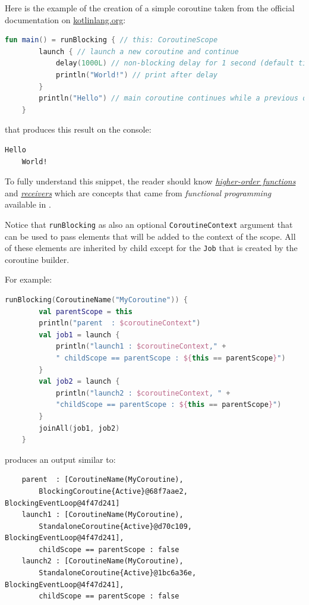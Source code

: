 Here is the example of the creation of a simple coroutine taken from the official documentation on \href{https://kotlinlang.org/docs/coroutines-basics.html#your-first-coroutine}{kotlinlang.org}:
\begin{lstlisting}[language=kotlin]
	fun main() = runBlocking { // this: CoroutineScope
		launch { // launch a new coroutine and continue
			delay(1000L) // non-blocking delay for 1 second (default time unit is ms)
			println("World!") // print after delay
		}
		println("Hello") // main coroutine continues while a previous one is delayed
	}
\end{lstlisting}

that produces this result on the console:
\begin{lstlisting}[numbers=none]
	Hello
	World!
\end{lstlisting}

To fully understand this snippet, the reader should know \href{https://kotlinlang.org/docs/lambdas.html#higher-order-functions}{\textit{higher-order functions}} and \href{https://kotlinlang.org/docs/lambdas.html#function-types}{\textit{receivers}} which are concepts that came from \textit{functional programming} available in \Kotlin.

Notice that \texttt{runBlocking} as also an optional \texttt{CoroutineContext} argument that can be used to pass elements that will be added to the context of the scope. All of these elements are inherited by child except for the \texttt{Job} that is created by the coroutine builder.

For example:
\begin{lstlisting}[language=Kotlin]
	runBlocking(CoroutineName("MyCoroutine")) {
		val parentScope = this
		println("parent  : $coroutineContext")
		val job1 = launch {
			println("launch1 : $coroutineContext," +
			" childScope == parentScope : ${this == parentScope}")
		}
		val job2 = launch {
			println("launch2 : $coroutineContext, " +
			"childScope == parentScope : ${this == parentScope}")
		}
		joinAll(job1, job2)
	}
\end{lstlisting}
produces an output similar to:
\begin{Verbatim}
	parent  : [CoroutineName(MyCoroutine),
		BlockingCoroutine{Active}@68f7aae2, BlockingEventLoop@4f47d241]
	launch1 : [CoroutineName(MyCoroutine),
		StandaloneCoroutine{Active}@d70c109, BlockingEventLoop@4f47d241],
		childScope == parentScope : false
	launch2 : [CoroutineName(MyCoroutine),
		StandaloneCoroutine{Active}@1bc6a36e, BlockingEventLoop@4f47d241],
		childScope == parentScope : false
\end{Verbatim}

